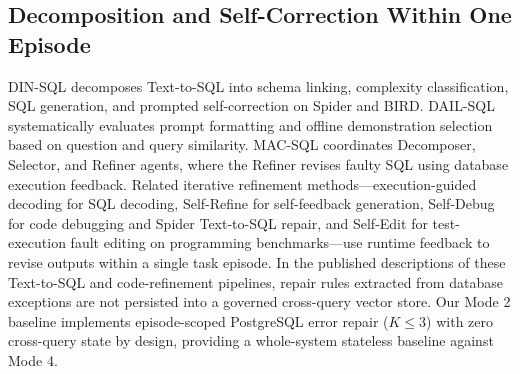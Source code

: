 \subsection{Decomposition and Self-Correction Within One Episode}
DIN-SQL \cite{pourreza2023dinsql} decomposes Text-to-SQL into schema linking, complexity classification, SQL generation, and prompted self-correction on Spider and BIRD. DAIL-SQL \cite{gao2024dailsql} systematically evaluates prompt formatting and offline demonstration selection based on question and query similarity. MAC-SQL \cite{wang2025macsql} coordinates Decomposer, Selector, and Refiner agents, where the Refiner revises faulty SQL using database execution feedback. Related iterative refinement methods---execution-guided decoding \cite{wang2018executionguided} for SQL decoding, Self-Refine \cite{madaan2023selfrefine} for self-feedback generation, Self-Debug \cite{chen2024selfdebug} for code debugging and Spider Text-to-SQL repair, and Self-Edit \cite{zhang2023selfedit} for test-execution fault editing on programming benchmarks---use runtime feedback to revise outputs within a single task episode. In the published descriptions of these Text-to-SQL and code-refinement pipelines, repair rules extracted from database exceptions are not persisted into a governed cross-query vector store. Our Mode 2 baseline implements episode-scoped PostgreSQL error repair ($K \le 3$) with zero cross-query state by design, providing a whole-system stateless baseline against Mode 4.

